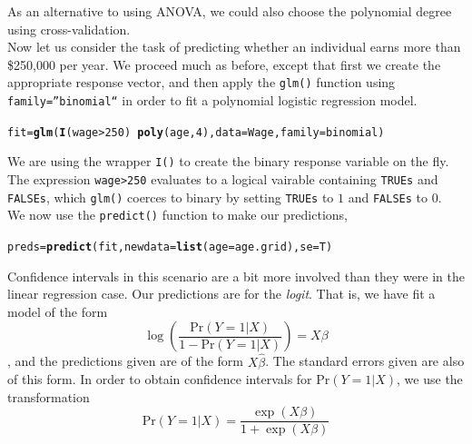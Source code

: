 \documentclass[12pt]{article}\usepackage[]{graphicx}\usepackage[]{color}
\makeatletter
\newcommand{\hlnum}[1]{\textcolor[rgb]{0.686,0.059,0.569}{#1}}%
\newcommand{\hlopt}[1]{\textcolor[rgb]{0,0,0}{#1}}%
\newcommand{\hlstd}[1]{\textcolor[rgb]{0.345,0.345,0.345}{#1}}%
\newcommand{\hlkwb}[1]{\textcolor[rgb]{0.69,0.353,0.396}{#1}}%
\newcommand{\hlkwc}[1]{\textcolor[rgb]{0.333,0.667,0.333}{#1}}%
\newcommand{\hlkwd}[1]{\textcolor[rgb]{0.737,0.353,0.396}{\textbf{#1}}}%
\newenvironment{kframe}{%
 \def\at@end@of@kframe{}%
 \ifinner\ifhmode%
  \def\at@end@of@kframe{\end{minipage}}%
  \begin{minipage}{\columnwidth}%
 \fi\fi%
 \def\FrameCommand##1{\hskip\@totalleftmargin \hskip-\fboxsep
 \colorbox{shadecolor}{##1}\hskip-\fboxsep
     \hskip-\linewidth \hskip-\@totalleftmargin \hskip\columnwidth}%
 \MakeFramed {\advance\hsize-\width
   \@totalleftmargin\z@ \linewidth\hsize
   \@setminipage}}%
 {\par\unskip\endMakeFramed%
 \at@end@of@kframe}
\newenvironment{knitrout}{}{} %
\makeatother
\begin{document}
As an alternative to using ANOVA, we could also choose the polynomial degree using cross-validation.\\

Now let us consider the task of predicting whether an individual earns more than \$250,000 per year. We proceed much as before, except that first we create the appropriate response vector, and then apply the \texttt{glm()} function using \texttt{family=''binomial``} in order to fit a polynomial logistic regression model.

\begin{knitrout}
\color{fgcolor}\begin{kframe}
\begin{alltt}
\hlstd{fit} \hlkwb{=} \hlkwd{glm}\hlstd{(}\hlkwd{I}\hlstd{(wage}\hlopt{>}\hlnum{250}\hlstd{)} \hlopt{~} \hlkwd{poly}\hlstd{(age,}\hlnum{4}\hlstd{),} \hlkwc{data} \hlstd{= Wage,} \hlkwc{family} \hlstd{= binomial)}
\end{alltt}
\end{kframe}
\end{knitrout}

We are using the wrapper \texttt{I()} to create the binary response variable on the fly. The expression \texttt{wage>250} evaluates to a logical vairable containing \texttt{TRUEs} and \texttt{FALSEs}, which \texttt{glm()} coerces to binary by setting \texttt{TRUEs} to $1$ and \texttt{FALSEs} to $0$.\\

We now use the \texttt{predict()} function to make our predictions,
\begin{knitrout}
\color{fgcolor}\begin{kframe}
\begin{alltt}
\hlstd{preds}\hlkwb{=}\hlkwd{predict}\hlstd{(fit,} \hlkwc{newdata}\hlstd{=}\hlkwd{list}\hlstd{(}\hlkwc{age}\hlstd{=age.grid),}\hlkwc{se}\hlstd{=T)}
\end{alltt}
\end{kframe}
\end{knitrout}

Confidence intervals in this scenario are a bit more involved than they were in the linear regression case. Our predictions are for the \textit{logit}. That is, we have fit a model of the form $$\log \left(\frac{\text{Pr}(Y=1|X)}{1 - \text{Pr}(Y=1|X)}\right) = X\beta$$, and the predictions given are of the form $X\hat{\beta}$. The standard errors given are also of this form. In order to obtain confidence intervals for $\text{Pr}(Y=1|X)$, we use the transformation $$\text{Pr}(Y=1|X) = \frac{\exp(X\beta)}{1 + \exp(X\beta)}$$
\end{document}
